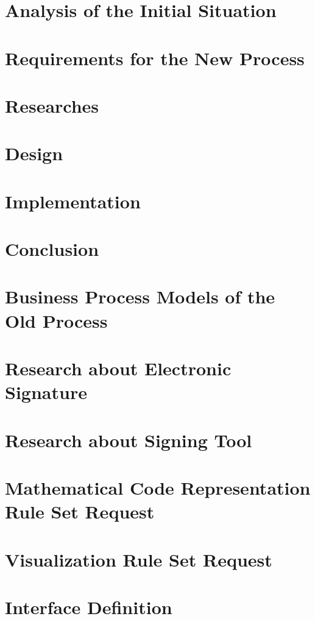 	\chapter{Analysis of the Initial Situation}
	\label{ch:analysis}
	
	
	\chapter{Requirements for the New Process}
	
	
	\chapter{Researches}
	
	
	\chapter{Design}
	
	
	\chapter{Implementation}
	
	
	\chapter{Conclusion}
	
	
	\printbibliography
	
	\clearpage
	\appendix
	\chapter{Business Process Models of the Old Process}
	\label{bpmnOld}
	
	
	\chapter{Research about Electronic Signature}
	\label{res:es}
	
	
	\chapter{Research about Signing Tool}
	\label{res:tool}
	
	
	\chapter{Mathematical Code Representation Rule Set Request}
	\label{mathCode}
		
	
	\chapter{Visualization Rule Set Request}
	\label{visuRuleset}
	
	\chapter{Interface Definition}
	\label{interfaceDef}
	
	
